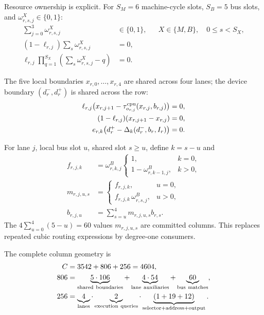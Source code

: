 \documentclass[10pt]{article}
\numberwithin{equation}{section}
\newcommand{\B}{\{0,1\}}
\begin{document}
Resource ownership is explicit.  For $S_M=6$ machine-cycle slots, $S_B=5$ bus slots,
and $\omega^{X}_{r,s,j}\in\B$:
\begin{align}
 \sum_{j=0}^{3}\omega^{X}_{r,s,j}&\in\B,
 &&X\in\{M,B\},\quad 0\le s<S_X,\\
 (1-\ell_{r,j})\sum_s\omega^{X}_{r,s,j}&=0,\\
 \ell_{r,j}\prod_{q=1}^{S_X}\left(\sum_s\omega^{X}_{r,s,j}-q\right)&=0.
 \label{eq:ownership}
\end{align}

The five local boundaries $x_{r,0},\ldots,x_{r,4}$ are shared across four lanes; the
device boundary $(d_r^-,d_r^+)$ is shared across the row:
\begin{align}
 \ell_{r,j}\bigl(x_{r,j+1}-\tau^{\rm cpu}_{o_{r,j}}(x_{r,j},b_{r,j})\bigr)&=0,\\
 (1-\ell_{r,j})(x_{r,j+1}-x_{r,j})&=0,\\
 e_{r,k}\bigl(d_r^+-\Delta_k(d_r^-,b_r,I_r)\bigr)&=0.
 \label{eq:lane-transition}
\end{align}

For lane $j$, local bus slot $u$, shared slot $s\ge u$, define $k=s-u$ and
\begin{align}
 f_{r,j,k}&=\omega^B_{r,k,j}
 \begin{cases}
 1,&k=0,\\
 1-\omega^B_{r,k-1,j},&k>0,
 \end{cases}\\
 m_{r,j,u,s}&=
 \begin{cases}
 f_{r,j,k},&u=0,\\
 f_{r,j,k}\,\omega^B_{r,s,j},&u>0,
 \end{cases}\\
 b_{r,j,u}&=\sum_{s=u}^{4}m_{r,j,u,s}b_{r,s}.
 \label{eq:bus-projection}
\end{align}
The $4\sum_{u=0}^{4}(5-u)=60$ values $m_{r,j,u,s}$ are committed columns.  This replaces
repeated cubic routing expressions by degree-one consumers.

The complete column geometry is
\begin{align}
 C&=3542+806+256=4604,\\
 806&=\underbrace{5\cdot106}_{\rm shared\ boundaries}
      +\underbrace{4\cdot54}_{\rm lane\ auxiliaries}
      +\underbrace{60}_{\rm bus\ matches},\\
 256&=\underbrace{4}_{\rm lanes}\cdot
      \underbrace{2}_{\rm execution\ queries}\cdot
      \underbrace{(1+19+12)}_{\rm selector+address+output}.
 \label{eq:columns}
\end{align}
\end{document}
